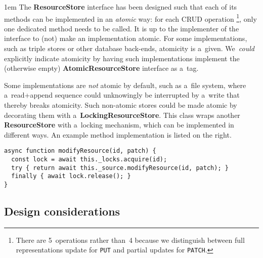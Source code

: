 \documentclass[10pt]{article}
\newenvironment{Note}
  {\begin{multicols}{3}%
     \parskip 1em}
  {\end{multicols}}
\begin{document}
\begin{Note}
The \textbf{ResourceStore} interface has been designed
such that each of its methods can be implemented
in an \emph{atomic} way:
for each CRUD operation%
\footnote{%
  There are 5~operations rather than~4
  because we distinguish between
  full representations update for \texttt{PUT}
  and partial updates for \texttt{PATCH}.
},
only one dedicated method needs to be called.
It is up to the implementer of the interface
to (not) make an implementation atomic.
For some implementations,
such as triple stores or other database back-ends,
atomicity is a~given.
We~\emph{could} explicitly indicate atomicity
by having such implementations
implement the (otherwise empty) \textbf{AtomicResourceStore} interface
as a~tag.

\columnbreak

Some implementations are \emph{not} atomic by default,
such as a~file system,
where a~read+append sequence could unknowingly
be interrupted by a~write
that thereby breaks atomicity.
Such non-atomic stores could be made atomic
by decorating them with a~\textbf{LockingResourceStore}.
This class wraps another \textbf{ResourceStore}
with a~locking mechanism,
which can be implemented in different ways.
An example method implementation is listed on the right.

\columnbreak

\begin{verbatim}
async function modifyResource(id, patch) {
  const lock = await this._locks.acquire(id);
  try { return await this._source.modifyResource(id, patch); }
  finally { await lock.release(); }
}
\end{verbatim}

\end{Note}

\subsection*{Design considerations}
\end{document}
